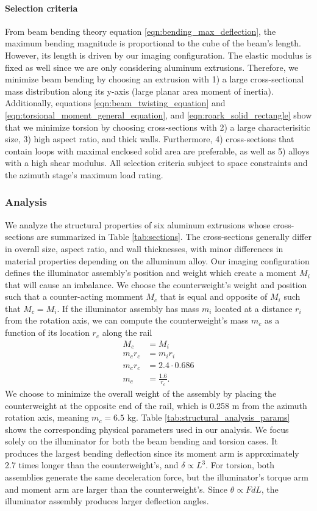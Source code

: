 \paragraph{Selection criteria} From beam bending theory equation \ref{eqn:bending_max_deflection}, the maximum bending magnitude is proportional to the cube of the beam's length. However, its length is driven by our imaging configuration. The elastic modulus is fixed as well since we are only considering aluminum extrusions. Therefore, we minimize beam bending by choosing an extrusion with 1) a large cross-sectional mass distribution along its y-axis (large planar area moment of inertia). Additionally, equations \ref{eqn:beam_twisting_equation} and \ref{eqn:torsional_moment_general_equation}, and \ref{eqn:roark_solid_rectangle} show that we minimize torsion by choosing cross-sections with 2) a large characterisitic size, 3) high aspect ratio, and thick walls. Furthermore, 4) cross-sections that contain loops with maximal enclosed solid area are preferable, as well as 5) alloys with a high shear modulus. All selection criteria subject to space constraints and the azimuth stage's maximum load rating.

\subsubsection{Analysis}
We analyze the structural properties of six aluminum extrusions whose cross-sections are summarized in Table \ref{tab:sections}. The cross-sections generally differ in overall size, aspect ratio, and wall thicknesses, with minor differences in material properties depending on the alluminum alloy. Our imaging configuration defines the illuminator assembly's position and weight which create a moment $M_i$ that will cause an imbalance. We choose the counterweight's weight and position such that a counter-acting momment $M_c$ that is equal and opposite of $M_i$ such that $M_c = M_i$. If the illuminator assembly has mass $m_i$ located at a distance $r_i$ from the rotation axis, we can compute the counterweight's mass $m_c$ as a function of its location $r_c$ along the rail
%
\begin{align}
    M_c &= M_i \\
    m_c r_c &= m_i r_i \\
    m_c r_c &= 2.4 \cdot 0.686 \\
    m_c &= \frac{1.6}{r_c}.
\end{align}
%
We choose to minimize the overall weight of the assembly by placing the counterweight at the opposite end of the rail, which is 0.258 \si{m} from the azimuth rotation axis, meaning $m_c = 6.5$ \si{\kg}. Table \ref{tab:structural_analysis_params} shows the corresponding physical parameters used in our analysis. We focus solely on the illuminator for both the beam bending and torsion cases. It produces the largest bending deflection since its moment arm is approximately 2.7 times longer than the counterweight's, and $\delta \propto L^3$. For torsion, both assemblies generate the same deceleration force, but the illuminator's torque arm and moment arm are larger than the counterweight's. Since $\theta \propto FdL$, the illuminator assembly produces larger deflection angles.

